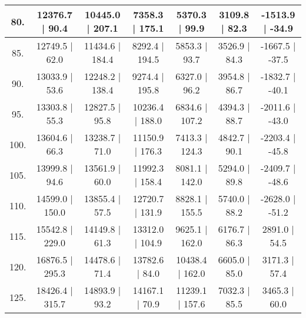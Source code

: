 \begin{tabular}{|c||c|c|c|c|c|c|}
\hline
  80. &  12376.7 |    90.4 &  10445.0 |   207.1 &   7358.3 |   175.1 &   5370.3 |    99.9 &   3109.8 |    82.3 &  -1513.9 |   -34.9\tabularnewline
\hline
  85. &  12749.5 |    62.0 &  11434.6 |   184.4 &   8292.4 |   194.5 &   5853.3 |    93.7 &   3526.9 |    84.3 &  -1667.5 |   -37.5\tabularnewline
\hline
  90. &  13033.9 |    53.6 &  12248.2 |   138.4 &   9274.4 |   195.8 &   6327.0 |    96.2 &   3954.8 |    86.7 &  -1832.7 |   -40.1\tabularnewline
\hline
  95. &  13303.8 |    55.3 &  12827.5 |    95.8 &  10236.4 |   188.0 &   6834.6 |   107.2 &   4394.3 |    88.7 &  -2011.6 |   -43.0\tabularnewline
\hline
 100. &  13604.6 |    66.3 &  13238.7 |    71.0 &  11150.9 |   176.3 &   7413.3 |   124.3 &   4842.7 |    90.1 &  -2203.4 |   -45.8\tabularnewline
\hline
 105. &  13999.8 |    94.6 &  13561.9 |    60.0 &  11992.3 |   158.4 &   8081.1 |   142.0 &   5294.0 |    89.8 &  -2409.7 |   -48.6\tabularnewline
\hline
 110. &  14599.0 |   150.0 &  13855.4 |    57.5 &  12720.7 |   131.9 &   8828.1 |   155.5 &   5740.0 |    88.2 &  -2628.0 |   -51.2\tabularnewline
\hline
 115. &  15542.8 |   229.0 &  14149.8 |    61.3 &  13312.0 |   104.9 &   9625.1 |   162.0 &   6176.7 |    86.3 &   2891.0 |    54.5\tabularnewline
\hline
 120. &  16876.5 |   295.3 &  14478.6 |    71.4 &  13782.6 |    84.0 &  10438.4 |   162.0 &   6605.0 |    85.0 &   3171.3 |    57.4\tabularnewline
\hline
 125. &  18426.4 |   315.7 &  14893.9 |    93.2 &  14167.1 |    70.9 &  11239.1 |   157.6 &   7032.3 |    85.5 &   3465.3 |    60.0\tabularnewline
\hline
\end{tabular}
